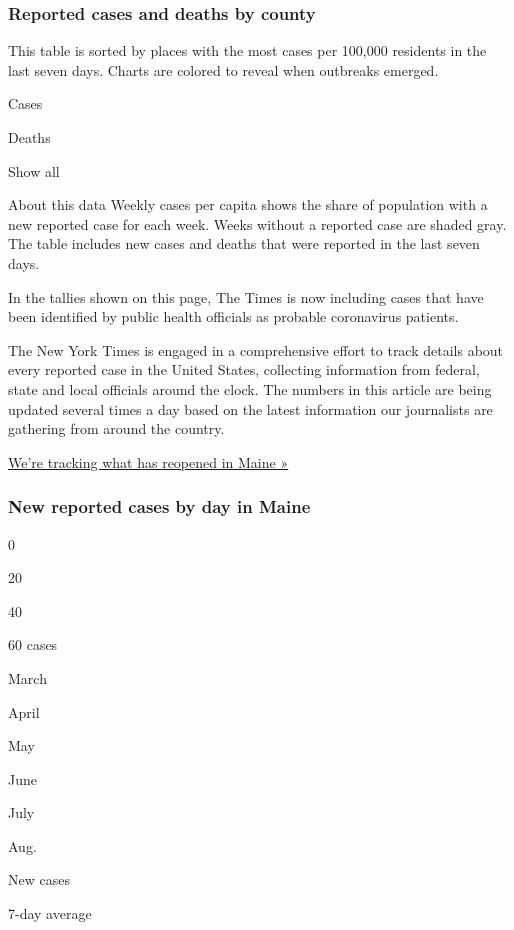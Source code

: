 \hypertarget{reported-cases-and-deaths-by-county}{%
\subsubsection{Reported cases and deaths by
county}\label{reported-cases-and-deaths-by-county}}

This table is sorted by places with the most cases per 100,000 residents
in the last seven days. Charts are colored to reveal when outbreaks
emerged.

Cases

Deaths

Show all

About this data Weekly cases per capita shows the share of population
with a new reported case for each week. Weeks without a reported case
are shaded gray. The table includes new cases and deaths that were
reported in the last seven days.

In the tallies shown on this page, The Times is now including cases that
have been identified by public health officials as probable coronavirus
patients.

The New York Times is engaged in a comprehensive effort to track details
about every reported case in the United States, collecting information
from federal, state and local officials around the clock. The numbers in
this article are being updated several times a day based on the latest
information our journalists are gathering from around the country.

\href{https://www.nytimes3xbfgragh.onion/interactive/2020/us/states-reopen-map-coronavirus.html}{We're
tracking what has reopened in Maine »}

\hypertarget{new-reported-cases-by-day-in-maine}{%
\subsubsection{New reported cases by day in
Maine}\label{new-reported-cases-by-day-in-maine}}

0

20

40

60 cases

March

April

May

June

July

Aug.

New cases

7-day average

